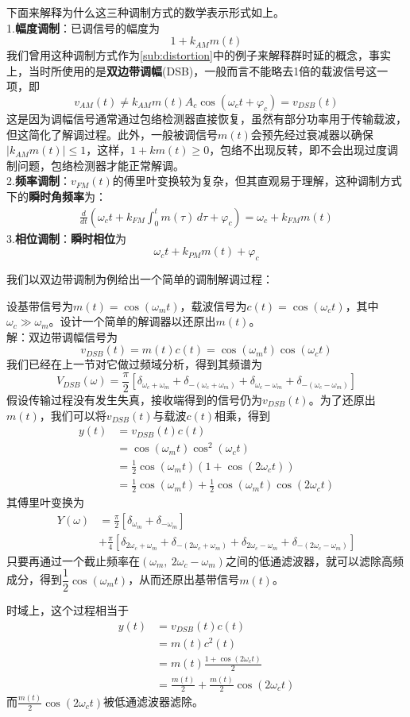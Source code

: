 下面来解释为什么这三种调制方式的数学表示形式如上。\\
1.\textbf{幅度调制}：已调信号的幅度为\[1+k_{AM}m(t)\]
我们曾用这种调制方式作为\ref{sub:distortion}中的例子来解释群时延的概念，事实上，当时所使用的是\textbf{双边带调幅}(DSB)，一般而言不能略去1倍的载波信号这一项，即
\[v_{AM}(t)\neq k_{AM} m(t)A_c \cos(\omega_c t+\varphi_c)=v_{DSB}(t)\]
这是因为调幅信号通常通过包络检测器直接恢复，虽然有部分功率用于传输载波，但这简化了解调过程。此外，一般被调信号$m(t)$会预先经过衰减器以确保$|k_{AM}m(t)|\leq 1$，这样，$1+km(t)\geq 0$，包络不出现反转，即不会出现过度调制问题，包络检测器才能正常解调。\\
2.\textbf{频率调制}：$v_{FM}(t)$的傅里叶变换较为复杂，但其直观易于理解，这种调制方式下的\textbf{瞬时角频率}为：\begin{align*}
    \frac{d}{dt}\left(\omega_c t+k_{FM}\int_{0}^{t}m(\tau)\,d\tau+\varphi_c\right)=\omega_c+k_{FM}m(t)
\end{align*}
3.\textbf{相位调制}：\textbf{瞬时相位}为\[\omega_c t+k_{PM} m(t)+\varphi_c\]

我们以双边带调制为例给出一个简单的调制解调过程：
\begin{example}
设基带信号为$m(t)=\cos(\omega_m t)$，载波信号为$c(t)=\cos(\omega_c t)$，其中$\omega_c\gg \omega_m$。设计一个简单的解调器以还原出$m(t)$。\\
解：双边带调幅信号为\[v_{DSB}(t)=m(t)c(t)=\cos(\omega_m t)\cos(\omega_c t)\]
我们已经在上一节对它做过频域分析，得到其频谱为
\[V_{DSB}(\omega)=\frac{\pi}{2}\left[\delta_{\omega_c+\omega_m}+\delta_{-(\omega_c+\omega_m)}+\delta_{\omega_c-\omega_m}+\delta_{-(\omega_c-\omega_m)}\right]\]
假设传输过程没有发生失真，接收端得到的信号仍为$v_{DSB}(t)$。为了还原出$m(t)$，我们可以将$v_{DSB}(t)$与载波$c(t)$相乘，得到
\begin{align*}
    y(t)&=v_{DSB}(t)c(t)\\
    &=\cos(\omega_m t)\cos^2(\omega_c t)\\
    &=\frac{1}{2}\cos(\omega_m t)(1+\cos(2\omega_c t))\\
    &=\frac{1}{2}\cos(\omega_m t)+\frac{1}{2}\cos(\omega_m t)\cos(2\omega_c t)
\end{align*}
其傅里叶变换为
\begin{align*}
    Y(\omega)&=\frac{\pi}{2}[\delta_{\omega_m}+\delta_{-\omega_m}]\\
    &+\frac{\pi}{4}[\delta_{2\omega_c+\omega_m}+\delta_{-(2\omega_c+\omega_m)}+\delta_{2\omega_c-\omega_m}+\delta_{-(2\omega_c-\omega_m)}]
\end{align*}
只要再通过一个截止频率在$(\omega_m,\ 2\omega_c-\omega_m)$之间的低通滤波器，就可以滤除高频成分，得到$\dfrac{1}{2}\cos(\omega_m t)$，从而还原出基带信号$m(t)$。
\end{example}
时域上，这个过程相当于\begin{align*}
    y(t)&=v_{DSB}(t)c(t)\\
    &=m(t)c^2(t)\\
    &=m(t)\frac{1+\cos(2\omega_c t)}{2}\\
    &=\frac{m(t)}{2}+\frac{m(t)}{2}\cos(2\omega_c t)
\end{align*}
而$\frac{m(t)}{2}\cos(2\omega_c t)$被低通滤波器滤除。

